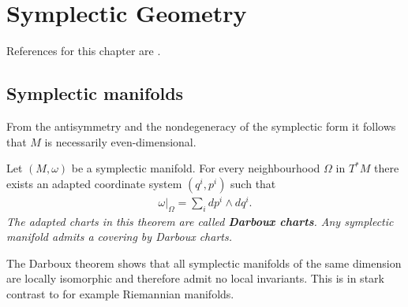 \chapter{Symplectic Geometry}\label{chapter:symplectic}

    References for this chapter are \cite{mcduff, symplectic}.

\section{Symplectic manifolds}


    \begin{property}[Dimension]
        From the antisymmetry and the nondegeneracy of the symplectic form it follows that $M$ is necessarily even-dimensional.
    \end{property}

    \begin{theorem}[Darboux]
        Let $(M,\omega)$ be a symplectic manifold. For every neighbourhood $\Omega$ in $T^*M$ there exists an adapted coordinate system $(q^i, p^i)$ such that
        \begin{gather}
            \left.\omega\right|_\Omega = \sum_idp^i\wedge dq^i.
        \end{gather}
        \emph{The adapted charts in this theorem are called \textbf{Darboux charts}. Any symplectic manifold admits a covering by Darboux charts.}
    \end{theorem}
    \begin{remark}
        The Darboux theorem shows that all symplectic manifolds of the same dimension are locally isomorphic and therefore admit no local invariants. This is in stark contrast to for example Riemannian manifolds.
    \end{remark}

